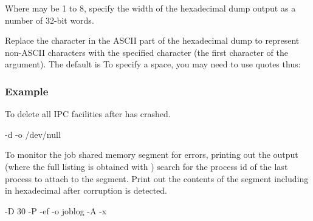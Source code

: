 
Where  may be 1 to 8, specify the width of the hexadecimal dump output as a number of 32-bit words.


Replace the character in the ASCII part of the hexadecimal dump to represent non-ASCII characters with the specified character
(the first character of the argument). The default is  To specify a space, you may need to use quotes
thus: 

\subsubsection{Example}
To delete all IPC facilities after \ProductName{} has crashed.

\begin{expara}

\XbRipcName{} -d -o /dev/null

\end{expara}

To monitor the job shared memory segment for errors, printing out the  output (where the full listing is obtained
with ) search for the process id of the last process to attach to the segment. Print out the contents of the
segment including in hexadecimal after corruption is detected.

\begin{expara}

\XbRipcName{} -D 30 -P -ef -o joblog -A -x

\end{expara}

